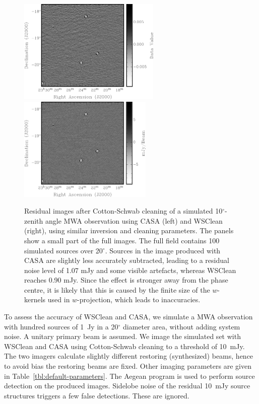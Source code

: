 \documentclass[useAMS,usenatbib]{mn2e}
\newcommand{\degree}{\ensuremath{^{\circ}}\xspace}
\begin{document}
\begin{figure}
\begin{center}
\includegraphics[height=5cm]{img/residual-casa}\hspace{1cm}\includegraphics[height=5cm]{img/residual-wsclean}
\caption{Residual images after Cotton-Schwab cleaning of a simulated 10\degree-zenith angle MWA observation using CASA (left) and WSClean (right), using similar inversion and cleaning parameters. The panels show a small part of the full images. The full field contains 100 simulated sources over 20\degree. Sources in the image produced with CASA are slightly less accurately subtracted, leading to a residual noise level of 1.07 mJy and some visible artefacts, whereas WSClean reaches 0.90 mJy. Since the effect is stronger away from the phase centre, it is likely that this is caused by the finite size of the $w$-kernels used in $w$-projection, which leads to inaccuracies.}
\label{fig:residuals}
\end{center}
\end{figure}

To assess the accuracy of WSClean and CASA, we simulate a MWA observation with hundred sources of 1~Jy in a 20\degree diameter area, without adding system noise. A unitary primary beam is assumed. We image the simulated set with WSClean and CASA using Cotton-Schwab cleaning to a threshold of 10~mJy. The two imagers calculate slightly different restoring (synthesized) beams, hence to avoid bias the restoring beams are fixed. Other imaging parameters are given in Table~\ref{tbl:default-parameters}. The Aegean program \citep{aegean-hancock-2012} is used to perform source detection on the produced images. Sidelobe noise of the residual 10~mJy source structures triggers a few false detections. These are ignored.
\end{document}
